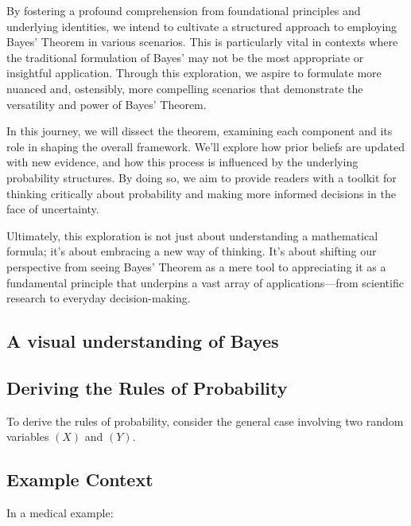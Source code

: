 \documentclass[
  12 pt,
  a4paper,
]{book}
\numberwithin{equation}{section}
\theoremstyle{plain}      %
\theoremstyle{definition} %
\theoremstyle{remark}     %
\theoremstyle{note}         %
\begin{document}
By fostering a profound comprehension from foundational principles and
underlying identities, we intend to cultivate a structured approach to
employing Bayes' Theorem in various scenarios. This is particularly
vital in contexts where the traditional formulation of Bayes' may not be
the most appropriate or insightful application. Through this
exploration, we aspire to formulate more nuanced and, ostensibly, more
compelling scenarios that demonstrate the versatility and power of
Bayes' Theorem.

In this journey, we will dissect the theorem, examining each component
and its role in shaping the overall framework. We'll explore how prior
beliefs are updated with new evidence, and how this process is
influenced by the underlying probability structures. By doing so, we aim
to provide readers with a toolkit for thinking critically about
probability and making more informed decisions in the face of
uncertainty.

Ultimately, this exploration is not just about understanding a
mathematical formula; it's about embracing a new way of thinking. It's
about shifting our perspective from seeing Bayes' Theorem as a mere tool
to appreciating it as a fundamental principle that underpins a vast
array of applications---from scientific research to everyday
decision-making.

\newpage

\hypertarget{a-visual-understanding-of-bayes}{%
\subsection{A visual understanding of
Bayes}\label{a-visual-understanding-of-bayes}}

\hypertarget{deriving-the-rules-of-probability}{%
\subsection{Deriving the Rules of
Probability}\label{deriving-the-rules-of-probability}}

To derive the rules of probability, consider the general case involving
two random variables \((X)\) and \((Y)\).

\hypertarget{example-context}{%
\subsection{Example Context}\label{example-context}}

In a medical example:
\end{document}
